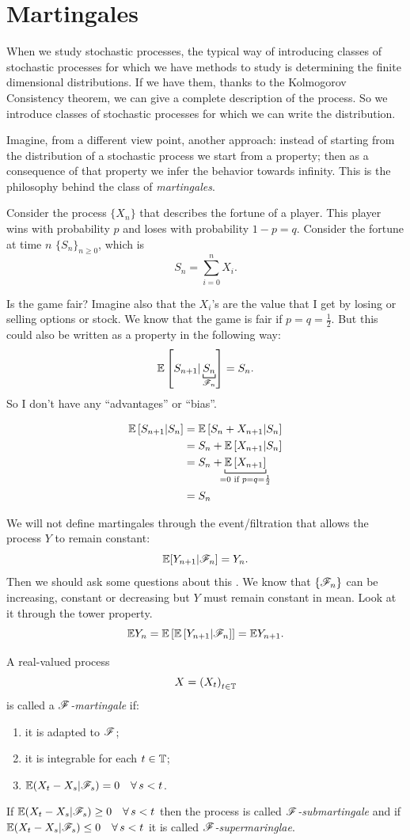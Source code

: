 \documentclass{report}
\begin{document}
\section{Martingales}
When we study stochastic processes, the typical way of introducing classes of stochastic processes for which we have methods to study is determining the finite dimensional distributions. If we have them, thanks to the Kolmogorov Consistency theorem, we can give a complete description of the process. So we introduce classes of stochastic processes for which we can write the distribution.\par
Imagine, from a different view point, another approach: instead of starting from the distribution of a stochastic process we start from a property; then as a consequence of that property we infer the behavior towards infinity. This is the philosophy behind the class of \emph{martingales}.
\begin{example}
	Consider the process $\{X_{n}\}$ that describes the fortune of a player. This player wins with probability $p$ and loses with probability $1-p=q$. Consider the fortune at time $n$ ${\{S_n\}}_{n\geq 0}$, which is 
	\[S_n=\sum_{i=0}^{n}X_i.\]
\end{example}
	Is the game fair? Imagine also that the $X_i$'s are the value that I get by losing or selling options or stock. We know that the game is fair if $p=q=\frac{1}{2}$. But this could also be written as a property in the following way:
	\[\ev\left[S_{n+1}|\underbracket[0.64pt]{S_n}_{\F_n}\right]=S_n.\]
	So I don't have any ``advantages'' or ``bias''.
	\begin{fancyproof}
		\begin{align*}
			\ev\left[S_{n+1}|S_n\right]&=\ev\left[S_n+X_{n+1}|S_n\right]\\
			&=S_n+\ev\left[X_{n+1}|S_n\right]\\
			&=S_n+\underbracket[0,6pt]{\ev\left[X_{n+1}\right]}_{\mathclap{=0\text{ if }p=q=\frac{1}{2}}}\\
			&=S_n
		\end{align*}
	\end{fancyproof}
We will not define martingales through the event/filtration that allows the process $Y$ to remain constant:
\[\mathbb{E}[Y_{n+1}|\mathscr{F}_n]=Y_n.\]
Then we should ask some questions about this \sa. We know that $\{\mathscr{F}_n\}$ can be increasing, constant or decreasing but $Y$ must remain constant in mean. Look at it through the tower property.
\[\mathbb{E} Y_n=\mathbb{E}\left[\mathbb{E}\left[Y_{n+1}|\mathscr{F}_n\right]\right]=\mathbb{E} Y_{n+1}.\]
\begin{definition}
	A real-valued process
	\[X={(X_t)}_{t\in\mathbb{T}}\]
	is called a \emph{$\mathscr{F}$-martingale} if:
	\begin{enumerate}
		\item it is adapted to $\mathscr{F}$;
		\item it is integrable for each $t\in\mathbb{T}$;
		\item $\mathbb{E}(X_t-X_s|\mathscr{F}_s)=0\quad\forall\, s<t$.
	\end{enumerate}
	If $\mathbb{E}(X_t-X_s|\mathscr{F}_s)\geq0\quad\forall\, s<t$ then the process is called \emph{$\mathscr{F}$-submartingale} and if $\mathbb{E}(X_t-X_s|\mathscr{F}_s)\leq0\quad\forall\, s<t$ it is called \emph{$\mathscr{F}$-supermaringlae}.
\end{definition}
\end{document}

